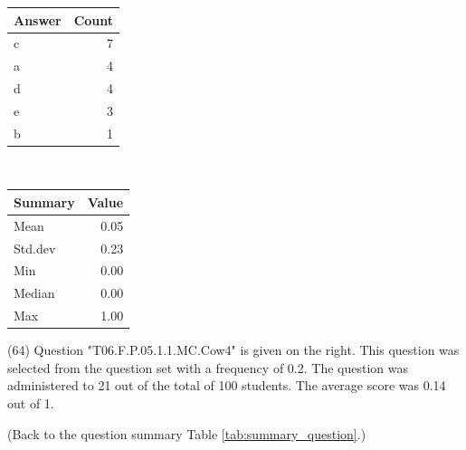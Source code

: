 \documentclass[12pt,nohyper]{tufte-handout}\usepackage[]{graphicx}\usepackage[]{color}
\begin{document}
\begin{center}%
\begin{tabular}{lr}
  \hline
Answer & Count \\ 
  \hline
c &   7 \\ 
  a &   4 \\ 
  d &   4 \\ 
  e &   3 \\ 
  b &   1 \\ 
   \hline
\end{tabular}
~~~~~~~~%
\begin{tabular}{lr}
  \hline
Summary & Value \\ 
  \hline
Mean & 0.05 \\ 
  Std.dev & 0.23 \\ 
  Min & 0.00 \\ 
  Median & 0.00 \\ 
  Max & 1.00 \\ 
   \hline
\end{tabular}
\end{center}\newpage{} (64) Question "T06.F.P.05.1.1.MC.Cow4" is given on the right. This question was selected from the question set with a frequency of 0.2. The question was administered to 21 out of the total of 100 students. The average score was 0.14 out of 1.

 (Back to the question summary Table \ref{tab:summary_question}.)
\end{document}
